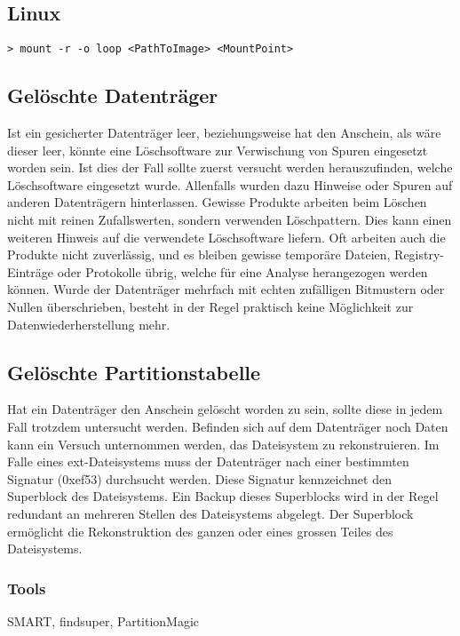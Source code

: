 \subsection{Linux}
\begin{lstlisting}
> mount -r -o loop <PathToImage> <MountPoint>
\end{lstlisting}



\subsection{Gelöschte Datenträger}
Ist ein gesicherter Datenträger leer, beziehungsweise hat den Anschein, als wäre dieser leer, könnte eine Löschsoftware zur Verwischung von Spuren eingesetzt worden sein. Ist dies der Fall sollte zuerst versucht werden herauszufinden, welche Löschsoftware eingesetzt wurde. Allenfalls wurden dazu Hinweise oder Spuren auf anderen Datenträgern hinterlassen. Gewisse Produkte arbeiten beim Löschen nicht mit reinen Zufallswerten, sondern verwenden Löschpattern. Dies kann einen weiteren Hinweis auf die verwendete Löschsoftware liefern. Oft arbeiten auch die Produkte nicht zuverlässig, und es bleiben gewisse temporäre Dateien, Registry-Einträge oder Protokolle übrig, welche für eine Analyse herangezogen werden können. Wurde der Datenträger mehrfach mit echten zufälligen Bitmustern oder Nullen überschrieben, besteht in der Regel praktisch keine Möglichkeit zur Datenwiederherstellung mehr.




\subsection{Gelöschte Partitionstabelle}
Hat ein Datenträger den Anschein gelöscht worden zu sein, sollte diese in jedem Fall trotzdem untersucht werden. Befinden sich auf dem Datenträger noch Daten kann ein Versuch unternommen werden, das Dateisystem zu rekonstruieren. Im Falle eines ext-Dateisystems muss der Datenträger nach einer bestimmten Signatur (0xef53) durchsucht werden. Diese Signatur kennzeichnet den Superblock des Dateisystems. Ein Backup dieses Superblocks wird in der Regel redundant an mehreren Stellen des Dateisystems abgelegt. Der Superblock ermöglicht die Rekonstruktion des ganzen oder eines grossen Teiles des Dateisystems.

\subsubsection{Tools} 
SMART, findsuper, PartitionMagic



